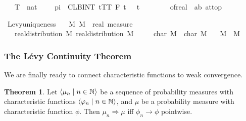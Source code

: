 \documentclass[leqno]{article}
\theoremstyle{definition}
\newtheorem{theorem}{Theorem}[section]
\newcommand{\bldseq}[2]{\langle{#1}\mid{#2}\rangle}
\begin{document}
\begin{isabellebody}
\ \ {\isacharparenleft}\ {\isachardoublequoteopen}{\isacharparenleft}{\isacharparenleft}{\isasymlambda}T\ {\isacharcolon}{\isacharcolon}\ nat{\isachardot}\ {}\ {\isacharslash}\ {\isacharparenleft}{}\ {\isacharasterisk}\ pi{\isacharparenright}\ {\isacharasterisk}\ {\isacharparenleft}CLBINT\ t{\isacharequal}{\isacharminus}T{\isachardot}{\isachardot}T{\isachardot}\ {\isacharquery}F\ t\ {\isacharasterisk}\ {\isasymphi}\ t{\isacharparenright}{\isacharparenright}\ {\isacharminus}{\isacharminus}{\isacharminus}{\isachargreater}\ \isanewline
\ \ \ \ \ \ of{\isacharunderscore}real\ {\isacharparenleft}{\isasymmu}\ {\isacharbraceleft}a{\isacharless}{\isachardot}{\isachardot}b{\isacharbraceright}{\isacharparenright}{\isacharparenright}\ at{\isacharunderscore}top{\isachardoublequoteclose}{\isacharparenright}
\end{isabellebody}

\medskip

\begin{isabellebody}
\isamarkupfalse%
\ Levy{\isacharunderscore}uniqueness{\isacharcolon}\isanewline
\ \ \ M{}\ M{}\ {\isacharcolon}{\isacharcolon}\ {\isachardoublequoteopen}real\ measure{\isachardoublequoteclose}\isanewline
\ \ \ {\isachardoublequoteopen}real{\isacharunderscore}distribution\ M{}{\isachardoublequoteclose}\ {\isachardoublequoteopen}real{\isacharunderscore}distribution\ M{}{\isachardoublequoteclose}\ \isanewline
\ \ \ \ {\isachardoublequoteopen}char\ M{}\ {\isacharequal}\ char\ M{}{\isachardoublequoteclose}\isanewline
\ \ \ {\isachardoublequoteopen}M{}\ {\isacharequal}\ M{}{\isachardoublequoteclose}
\end{isabellebody}

\subsubsection{The L\'evy Continuity Theorem}

We are finally ready to connect characteristic functions to weak convergence.

\begin{theorem}
Let $\bldseq{\mu_n}{n \in \N}$ be a sequence of probability measures with characteristic functions $\bldseq{\phi_n}{n \in \N}$, and $\mu$ be a probability measure with characteristic function $\phi$. Then $\mu_n \Rightarrow \mu$ iff $\phi_n \rightarrow \phi$ pointwise.
\end{theorem}
\end{document}
